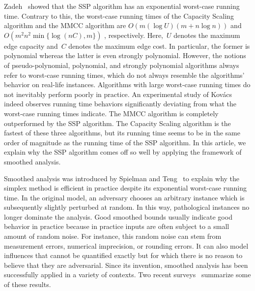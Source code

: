 \documentclass[11pt]{article}
\begin{document}
Zadeh~\cite{Zad73} showed that the SSP algorithm has an exponential worst-case running time. Contrary to this,
the worst-case running times of the Capacity Scaling algorithm and the MMCC algorithm are $O(m (\log U) (m + n\log n))$ \cite{DBLP:journals/jacm/EdmondsK72} and $O(m^2n^2 \min \{ \log(nC), m \})$ \cite{DBLP:journals/algorithmica/RadzikG94}, respectively. Here,~$U$ denotes the maximum edge capacity and~$C$ denotes the maximum edge cost. In particular, the former is polynomial whereas the latter is even strongly polynomial.
However, the notions of pseudo-polynomial, polynomial, and strongly polynomial algorithms always refer to worst-case running times,
which do not always resemble the algorithms' behavior on real-life instances. Algorithms with large worst-case running times do not inevitably perform poorly in practice. An experimental study of Kov{\'a}cs~\cite{Kir14} indeed observes running time behaviors significantly deviating from what the worst-case running times indicate. The MMCC algorithm is completely outperformed by the SSP algorithm. The Capacity Scaling algorithm is the fastest of these three algorithms, but its running time seems to be in the same order of magnitude as the running time of the SSP algorithm.
In this article, we explain why the SSP algorithm comes off so well by applying the framework of smoothed analysis.

Smoothed analysis was introduced by Spielman and Teng~\cite{DBLP:journals/jacm/SpielmanT04} to explain why the simplex method is efficient in practice despite its exponential worst-case running time. In the original model, an adversary chooses an arbitrary instance which is subsequently slightly perturbed at random. In this way, pathological instances no longer dominate the analysis. Good smoothed bounds usually indicate good behavior in practice because in practice inputs are often subject to a small amount of random noise. For
instance, this random noise can stem from measurement errors, numerical imprecision, or rounding errors. It can also model influences that cannot be quantified exactly but for which there is no reason to believe that they are adversarial. Since its invention, smoothed analysis has been successfully applied in a variety of contexts. Two recent surveys~\cite{MR,SpielmanT09} summarize some of these results.
\end{document}
